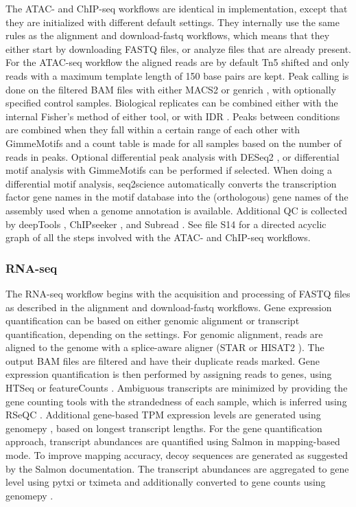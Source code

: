 The ATAC- and ChIP-seq workflows are identical in implementation, except that they are initialized with different default settings. They internally use the same rules as the alignment and download-fastq workflows, which means that they either start by downloading FASTQ files,  or analyze files that are already present. For the ATAC-seq workflow the aligned reads are by default Tn5 shifted \cite{Yan2020} and only reads with a maximum template length of 150 base pairs are kept. Peak calling is done on the filtered BAM files with either MACS2 \cite{macs2} or genrich \cite{genrich}, with optionally specified control samples. Biological replicates can be combined either with the internal Fisher's method of either tool, or with IDR \cite{idr}. Peaks between conditions are combined when they fall within a certain range of each other with GimmeMotifs \cite{Bruse_2018} and a count table is made for all samples based on the number of reads in peaks. Optional differential peak analysis with DESeq2 \cite{deseq2}, or differential motif analysis with GimmeMotifs \cite{Bruse_2018} can be performed if selected. When doing a differential motif analysis, seq2science automatically converts the transcription factor gene names in the motif database into the (orthologous) gene names of the assembly used when a genome annotation is available. Additional QC is collected by deepTools \cite{deeptools}, ChIPseeker \cite{chipseeker}, and Subread \cite{subread}. See file S14 for a directed acyclic graph of all the steps involved with the ATAC- and ChIP-seq workflows.

\subsubsection{RNA-seq}

The RNA-seq workflow begins with the acquisition and processing of FASTQ files as described in the alignment and download-fastq workflows. Gene expression quantification can be based on either genomic alignment or transcript quantification, depending on the settings. For genomic alignment, reads are aligned to the genome with a splice-aware aligner (STAR \cite{star} or HISAT2 \cite{hisat2}). The output BAM files are filtered and have their duplicate reads marked. Gene expression quantification is then performed by assigning reads to genes, using HTSeq \cite{htseq} or featureCounts \cite{subread}. Ambiguous transcripts are minimized by providing the gene counting tools with the strandedness of each sample, which is inferred using RSeQC \cite{rseqc}. Additional gene-based TPM expression levels are generated using genomepy \cite{genomepy}, based on longest transcript lengths. For the gene quantification approach, transcript abundances are quantified using Salmon \cite{salmon} in mapping-based mode. To improve mapping accuracy, decoy sequences are generated as suggested by the Salmon documentation. The transcript abundances are aggregated to gene level using pytxi \cite{pytxi} or tximeta \cite{tximeta} and additionally converted to gene counts using genomepy \cite{genomepy}. 

